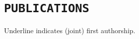 \documentclass[11pt,a4paper,sans]{moderncv}        %
\newcommand\colourhref[3][color2]{\href{#2}{\color{#1}#3}}
\begin{document}
\section{\texttt{PUBLICATIONS}}
Underline indicates (joint) first authorship.
\nocite{*}
\printbibliography[heading=none]



\pagestyle{fancy}
\end{document}
